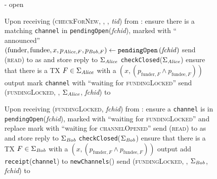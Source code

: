 \begin{figure}[H]
\begin{systembox}{\fpaynet{} - open}
\begin{algorithmic}[1]
        \State Upon receiving (\textsc{checkForNew}, \alice, \bob, \textit{tid})
        from \alice:
        \Indent
          \State ensure there is a matching \texttt{channel} in
          \texttt{pendingOpen}(\textit{fchid}), marked with ``\alice{}
          announced''
          \label{alg:fpaynet:checkForNew:valid}
          \State $\left(\mathrm{funder}, \mathrm{fundee}, x, p_{\mathit{Alice}, F},
          p_{\mathit{Bob}, F}\right) \gets
          \mathtt{pendingOpen}\left(\mathit{fchid}\right)$
          \State send (\textsc{read}) to \ledger{} as \alice{} and store reply
          to $\Sigma_{\mathit{Alice}}$
          \State \texttt{checkClosed}($\Sigma_{\mathit{Alice}}$)
          \label{alg:fpaynet:checkForNew:read:alice}
          \State ensure that there is a TX $F \in \Sigma_{\mathit{Alice}}$ with a
          $\left(x, \left(p_{\mathrm{funder}, F} \wedge p_{\mathrm{fundee},
          F}\right)\right)$ output
          \label{alg:fpaynet:checkForNew:included}
          \State mark \texttt{channel} with ``waiting for
          \textsc{fundingLocked}''
          \State send (\textsc{fundingLocked}, \alice, $\Sigma_{\mathit{Alice}}$,
          \textit{fchid}) to \simulator
          \label{alg:fpaynet:checkForNew:sim}
        \EndIndent
        \Statex


        \State Upon receiving (\textsc{fundingLocked}, \textit{fchid}) from
        \simulator:
        \Indent
          \State ensure a \texttt{channel} is in
          \texttt{pendingOpen}(\textit{fchid}), marked with ``waiting for
          \textsc{fundingLocked}'' and replace mark with ``waiting for
          \textsc{channelOpened}''
          \State send (\textsc{read}) to \ledger{} as \bob{} and store reply
          to $\Sigma_{\mathit{Bob}}$
          \State \texttt{checkClosed}($\Sigma_{\mathit{Bob}}$)
          \label{alg:fpaynet:checkForNew:read:bob}
          \State ensure that there is a TX $F \in \Sigma_{\mathit{Bob}}$ with a
          $\left(x, \left(p_{\mathrm{funder}, F} \wedge p_{\mathrm{fundee},
          F}\right)\right)$ output
          \State add \texttt{receipt}(\texttt{channel}) to
          \texttt{newChannels}(\bob)
          \label{alg:fpaynet:fundingLocked:report}
          \State send (\textsc{fundingLocked}, \bob, $\Sigma_{\mathit{Bob}}$,
          \textit{fchid}) to \simulator
          \label{alg:fpaynet:fundingLocked:sim}
        \EndIndent
        \Statex


\end{algorithmic}
\end{systembox}
\end{figure}
